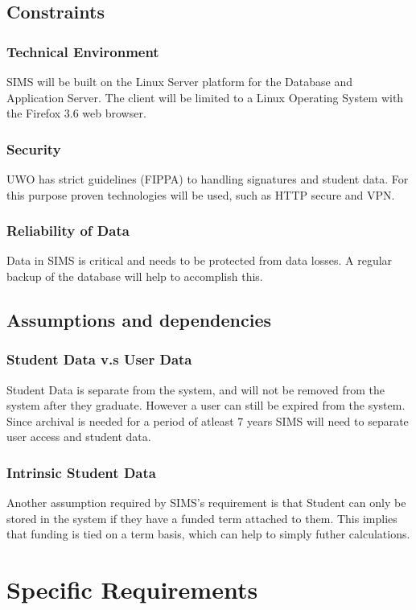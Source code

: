 \documentclass{journal}
\begin{document}
\subsection{Constraints}

\subsubsection{Technical Environment}
SIMS will be built on the Linux Server platform for the Database and Application Server. The client will be limited to a Linux Operating System with the Firefox 3.6 web browser.  
\subsubsection{Security}
UWO has strict guidelines (FIPPA) to handling signatures and student data. For this purpose proven technologies will be used, such as HTTP secure and VPN.
\subsubsection{Reliability of Data}
Data in SIMS is critical and needs to be protected from data losses. A regular backup of the database will help to accomplish this. 

\subsection{Assumptions and dependencies}
\subsubsection{Student Data v.s User Data}
Student Data is separate from the system, and will not be removed from the system after they graduate. However a user can still be expired from the system. Since archival is needed for a period of atleast 7 years SIMS will need to separate user access and student data. 
\subsubsection{Intrinsic Student Data}
Another assumption required by SIMS's requirement is that Student can only be stored in the system if they have a funded term attached to them. This implies that funding is tied on a term basis, which can help to simply futher calculations. 

\section{Specific Requirements}
\end{document}
